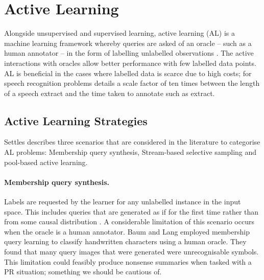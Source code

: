 \documentclass[ %
                    author={James Stephenson},
                supervisor={Dr. Edwin Simpson},
                    degree={MSc},
                     title={Project Plan: Bayesian Deep Learning For Extractive Test Summarisation},
                  subtitle={},
                      type={},
                      year={2022}]{../additions/dissertation}
\begin{document}
		
		\section{Active Learning}
		\label{chap:literaturereview:active}
		
		Alongside unsupervised and supervised learning, active learning (AL) is a machine learning framework whereby queries are asked of an oracle – such as a human annotator – in the form of labelling unlabelled observations \cite{Settles09}. The active interactions with oracles allow better performance with few labelled data points. AL is beneficial in the cases where labelled data is scarce due to high costs; for speech recognition problems \cite{Zhu05} details a scale factor of ten times between the length of a speech extract and the time taken to annotate such as extract.
		
			\subsection{Active Learning Strategies}
			\label{chap:literaturereview:active:strategies}
			
			Settles \cite{Settles09} describes three scenarios that are considered in the literature to categorise AL problems: Membership query synthesis, Stream-based selective sampling and pool-based active learning.

			\paragraph{Membership query synthesis.}  Labels are requested by the learner for any unlabelled instance in the input space. This includes queries that are generated as if for the first time rather than from some causal distribution \cite{Angluin88}. A considerable limitation of this scenario occurs when the oracle is a human annotator. Baum and Lang \cite{Baum92} employed membership query learning to classify handwritten characters using a human oracle. They found that many query images that were generated were unrecognisable symbols. This limitation could feasibly produce nonsense summaries when tasked with a PR situation; something we should be cautious of.
\end{document}
